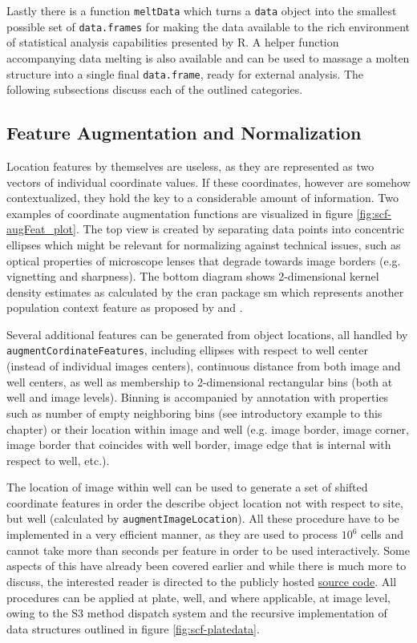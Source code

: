 Lastly there is a function \texttt{meltData} which turns a \texttt{data} object into the smallest possible set of \texttt{data.frames} for making the data available to the rich environment of statistical analysis capabilities presented by R. A helper function accompanying data melting is also available and can be used to massage a molten structure into a single final \texttt{data.frame}, ready for external analysis. The following subsections discuss each of the outlined categories.



\subsection{Feature Augmentation and Normalization}
\label{sec:scf-aug-norm}
Location features by themselves are useless, as they are represented as two vectors of individual coordinate values. If these coordinates, however are somehow contextualized, they hold the key to a considerable amount of information. Two examples of coordinate augmentation functions are visualized in figure \ref{fig:scf-augFeat_plot}. The top view is created by separating data points into concentric ellipses which might be relevant for normalizing against technical issues, such as optical properties of microscope lenses that degrade towards image borders (e.g. vignetting and sharpness). The bottom diagram shows 2-dimensional kernel density estimates as calculated by the \acrshort{cran} package sm \citep{Bowman1997} which represents another population context feature as proposed by \citet{Knapp2011} and \citet{Snijder2012}.

Several additional features can be generated from object locations, all handled by \texttt{augmentCordinateFeatures}, including ellipses with respect to well center (instead of individual images centers), continuous distance from both image and well centers, as well as membership to 2-dimensional rectangular bins (both at well and image levels). Binning is accompanied by annotation with properties such as number of empty neighboring bins (see introductory example to this chapter) or their location within image and well (e.g. image border, image corner, image border that coincides with well border, image edge that is internal with respect to well, etc.).

The location of image within well can be used to generate a set of shifted coordinate features in order the describe object location not with respect to site, but well (calculated by \texttt{augmentImageLocation}). All these procedure have to be implemented in a very efficient manner, as they are used to process \tilde $10^6$ cells and cannot take more than seconds per feature in order to be used interactively. Some aspects of this have already been covered earlier and while there is much more to discuss, the interested reader is directed to the publicly hosted \href{https://github.com/nbenn/singleCellFeatures}{source code}. All procedures can be applied at plate, well, and where applicable, at image level, owing to the S3 method dispatch system and the recursive implementation of data structures outlined in figure \ref{fig:scf-platedata}.

